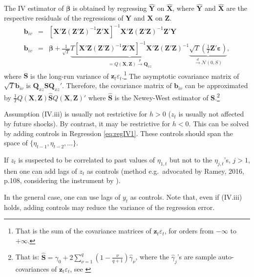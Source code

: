\documentclass[
  11pt,
]{book}
\theoremstyle{definition}
\theoremstyle{definition}
\theoremstyle{definition}
\theoremstyle{definition}
\theoremstyle{remark}
\begin{document}
The IV estimator of \(\boldsymbol\beta\) is obtained by regressing \(\hat{\mathbf{Y}}\) on \(\hat{\mathbf{X}}\), where \(\hat{\mathbf{Y}}\) and \(\hat{\mathbf{X}}\) are the respective residuals of the regressions of \(\mathbf{Y}\) and \(\mathbf{X}\) on \(\mathbf{Z}\).
\begin{eqnarray*}
\mathbf{b}_{iv} &=& [\mathbf{X}'\mathbf{Z}(\mathbf{Z}'\mathbf{Z})^{-1}\mathbf{Z}'\mathbf{X}]^{-1}\mathbf{X}'\mathbf{Z}(\mathbf{Z}'\mathbf{Z})^{-1}\mathbf{Z}'\mathbf{Y}\\
\mathbf{b}_{iv} &=& \boldsymbol\beta + \frac{1}{\sqrt{T}}\underbrace{T[\mathbf{X}'\mathbf{Z}(\mathbf{Z}'\mathbf{Z})^{-1}\mathbf{Z}'\mathbf{X}]^{-1}\mathbf{X}'\mathbf{Z}(\mathbf{Z}'\mathbf{Z})^{-1}}_{=Q(\mathbf{X},\mathbf{Z}) \overset{p}{\rightarrow} \mathbf{Q}_{xz}}\underbrace{\sqrt{T}\left(\frac{1}{T}\mathbf{Z}'\boldsymbol\varepsilon\right)}_{\overset{d}{\rightarrow} \mathcal{N}(0,S)},
\end{eqnarray*}
where \(\mathbf{S}\) is the long-run variance of \(\mathbf{z}_t\varepsilon_t\).\footnote{That is the sum of the covariance matrices of \(\mathbf{z}_t\varepsilon_t\), for orders from \(-\infty\) to \(+\infty\).} The asymptotic covariance matrix of \(\sqrt{T}\mathbf{b}_{iv}\) is \(\mathbf{Q}_{xz} \mathbf{S} \mathbf{Q}_{xz}'\). Therefore, the covariance matrix of \(\mathbf{b}_{iv}\) can be approximated by \(\frac{1}{T}Q(\mathbf{X},\mathbf{Z})\hat{\mathbf{S}}Q(\mathbf{X},\mathbf{Z})'\) where \(\hat{\mathbf{S}}\) is the Newey-West estimator of \(\mathbf{S}\).\footnote{That is: \(\hat{\mathbf{S}}=\hat\gamma_0 + 2 \sum_{\nu=1}^{q}\left(1-\frac{\nu}{q+1}\right) \hat\gamma_\nu\), where the \(\hat\gamma_j\)'s are sample auto-covariances of \(\mathbf{z}_t\varepsilon_t\), see \citet{Newey_West_1987}}

Assumption (IV.iii) is usually not restrictive for \(h>0\) (\(z_t\) is usually not affected by future shocks). By contrast, it may be restrictive for \(h<0\). This can be solved by adding controls in Regression \eqref{eq:regIV1}. These controls should span the space of \(\{\eta_{t-1},\eta_{t-2},\dots\}\).

If \(z_t\) is suspected to be correlated to past values of \(\eta_{1,t}\) but not to the \(\eta_{j,t}\)'s, \(j>1\), then one can add lags of \(z_t\) as controls (method e.g.~advocated by Ramey, 2016, p.108, considering the instrument by \citet{Gertler_Karadi_2015}).

In the general case, one can use lags of \(y_t\) as controls. Note that, even if (IV.iii) holds, adding controls may reduce the variance of the regression error.
\end{document}
